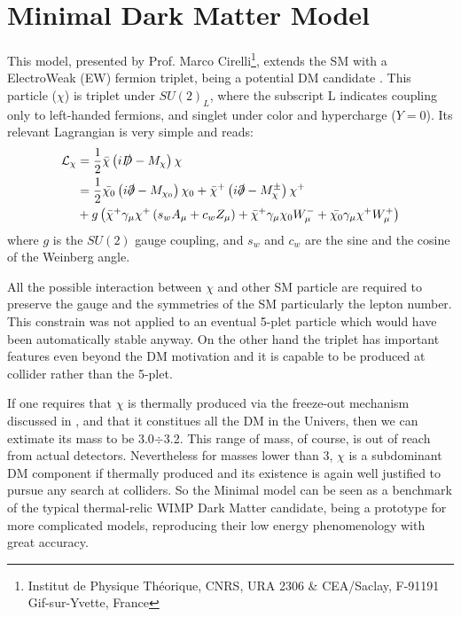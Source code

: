 \section{Minimal Dark Matter Model}
This model, presented by Prof. Marco Cirelli\footnote{Institut de Physique Th\'eorique, CNRS, URA 2306 \& CEA/Saclay, F-91191 Gif-sur-Yvette, France}, extends the SM with a ElectroWeak (EW) fermion triplet, being a potential DM candidate \cite{Cirelli:paper}. This particle ($\chi$) is triplet under $SU(2)_L$, where the subscript L indicates coupling only to left-handed fermions, and singlet under color and hypercharge ($Y=0$). Its relevant Lagrangian is very simple and reads:
\begin{equation}
\begin{split}
\mathcal{L}_\chi&=\frac{1}{2}\bar{\chi}\left(i\slashed{D}-M_\chi\right)\chi \\
			&= \frac{1}{2}\bar{\chi_0}\left(i\slashed{\partial}-M_{\chi_0}\right)\chi_0+\bar{\chi}^+\left(i\slashed{\partial}-M_{\chi}^\pm\right)\chi^+ \\
			&+ g \left(\bar{\chi}^+\gamma_\mu\chi^+\left(s_w A_\mu + c_w Z_\mu \right) +\bar{\chi}^+ \gamma_\mu\chi_0W^-_\mu + \bar{\chi_0}\gamma_\mu\chi^+W^+_\mu \right)
\end{split}
\end{equation}
where $g$ is the $SU(2)$ gauge coupling, and $s_w$ and $c_w$ are the sine and the cosine of the Weinberg angle.

All the possible interaction between $\chi$ and other SM particle are required to preserve the gauge and the symmetries of the SM particularly the lepton number. This constrain was not applied to an eventual 5-plet particle which would have been automatically stable anyway. On the other hand the triplet has important features even beyond the DM motivation and it is capable to be produced at collider rather than the 5-plet.

If one requires that $\chi$ is thermally produced via the freeze-out mechanism discussed in \Sect{\ref{sec:wimp}}, and that it constitues all the DM in the Univers, then we can extimate its mass to be \SI{3.0}{}$\div$\SI{3.2}{\tev}. This range of mass, of course, is out of reach from actual detectors. Nevertheless for masses lower than \SI{3}{\tev}, $\chi$ is a subdominant DM component if thermally produced and its existence is again well justified to pursue any search at colliders. So the Minimal model can be seen as a benchmark of the typical thermal-relic WIMP Dark Matter candidate, being a prototype for more complicated models, reproducing their low energy phenomenology with great accuracy.

